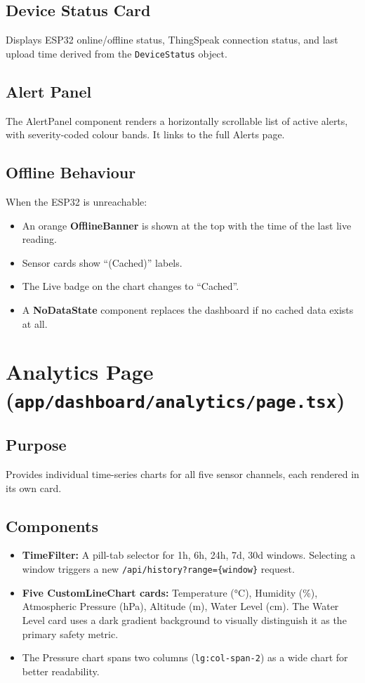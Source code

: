 \subsection{Device Status Card}
Displays ESP32 online/offline status, ThingSpeak connection status, and last upload time derived from the \texttt{DeviceStatus} object.

\subsection{Alert Panel}
The AlertPanel component renders a horizontally scrollable list of active alerts, with severity-coded colour bands. It links to the full Alerts page.

\subsection{Offline Behaviour}
When the ESP32 is unreachable:
\begin{itemize}[leftmargin=1.5em]
  \item An orange \textbf{OfflineBanner} is shown at the top with the time of the last live reading.
  \item Sensor cards show ``(Cached)'' labels.
  \item The Live badge on the chart changes to ``Cached''.
  \item A \textbf{NoDataState} component replaces the dashboard if no cached data exists at all.
\end{itemize}

\section{Analytics Page (\texttt{app/\allowbreak{}dashboard/\allowbreak{}analytics/\allowbreak{}page.\allowbreak{}tsx})}

\subsection{Purpose}
Provides individual time-series charts for all five sensor channels, each rendered in its own card.

\subsection{Components}
\begin{itemize}[leftmargin=1.5em]
  \item \textbf{TimeFilter:} A pill-tab selector for 1h, 6h, 24h, 7d, 30d windows. Selecting a window triggers a new \texttt{/\allowbreak{}api/\allowbreak{}history?range=\{window\}} request.
  \item \textbf{Five CustomLineChart cards:} Temperature (°C), Humidity (\%), Atmospheric Pressure (hPa), Altitude (m), Water Level (cm). The Water Level card uses a dark gradient background to visually distinguish it as the primary safety metric.
  \item The Pressure chart spans two columns (\texttt{lg:col-span-2}) as a wide chart for better readability.
\end{itemize}

